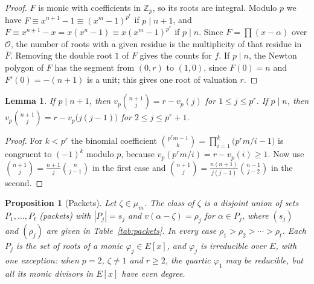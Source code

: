 \documentclass[11pt]{amsart}
\newtheorem{lemma}[theorem]{Lemma}
\newtheorem{proposition}[theorem]{Proposition}
\theoremstyle{definition}
\theoremstyle{remark}
\numberwithin{equation}{section}
\newcommand{\Z}{\mathbb{Z}}
\newcommand{\cO}{\mathcal{O}}
\begin{document}
\begin{proof}
$F$ is monic with coefficients in $\Z_p$, so its roots are integral.
Modulo $p$ we have $F\equiv x^{n+1}-1\equiv(x^m-1)^{p^r}$ if $p\mid n+1$, and
$F\equiv x^{n+1}-x=x(x^n-1)\equiv x(x^m-1)^{p^r}$ if $p\mid n$. Since
$F=\prod(x-\alpha)$ over $\cO$, the number of roots with a given residue
is the multiplicity of that residue in $\overline F$. Removing the double
root $1$ of $F$ gives the counts for $f$. If $p\mid n$, the Newton
polygon of $F$ has the segment from $(0,r)$ to $(1,0)$, since $F(0)=n$ and
$F'(0)=-(n+1)$ is a unit; this gives one root of valuation $r$.
\end{proof}

\begin{lemma}\label{lem:binom}
If $p\mid n+1$, then $v_p\binom{n+1}j=r-v_p(j)$ for $1\le j\le p^r$.
If $p\mid n$, then $v_p\binom{n+1}j=r-v_p\bigl(j(j-1)\bigr)$ for
$2\le j\le p^r+1$.
\end{lemma}

\begin{proof}
For $k<p^r$ the binomial coefficient
$\binom{p^rm-1}{k}=\prod_{i=1}^k\bigl(p^rm/i-1\bigr)$ is congruent to
$(-1)^k$ modulo $p$, because $v_p(p^rm/i)=r-v_p(i)\ge1$. Now use
$\binom{n+1}j=\frac{n+1}j\binom{n}{j-1}$ in the first case and
$\binom{n+1}{j}=\frac{n(n+1)}{j(j-1)}\binom{n-1}{j-2}$ in the second.
\end{proof}

\begin{proposition}[Packets]\label{prop:packets}
Let $\zeta\in\mu_m$. The class of $\zeta$ is a disjoint union of sets
$P_1,\dots,P_t$ (\emph{packets}) with $|P_j|=s_j$ and
$v(\alpha-\zeta)=\rho_j$ for $\alpha\in P_j$, where $(s_j)$ and $(\rho_j)$
are given in Table~\ref{tab:packets}. In every case
$\rho_1>\rho_2>\cdots>\rho_t$. Each $P_j$ is the set of roots of a monic
$\varphi_j\in E[x]$, and $\varphi_j$ is irreducible over $E$, with one
exception: when $p=2$, $\zeta\ne1$ and $r\ge2$, the quartic $\varphi_1$
may be reducible, but all its monic divisors in $E[x]$ have even degree.
\end{proposition}
\end{document}
